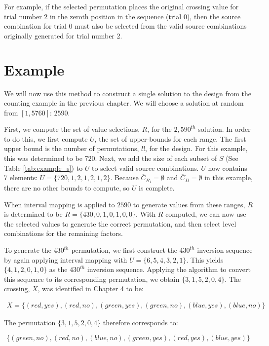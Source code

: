 For example, if the selected permutation places the original crossing value for trial number 2 in the zeroth position in the sequence (trial 0), then the source combination for trial 0 must also be selected from the valid source combinations originally generated for trial number 2.


\section{Example}

We will now use this method to construct a single solution to the design from the counting example in the previous chapter. We will choose a solution at random from $[1, 5760]$: $2590$.

First, we compute the set of value selections, $R$, for the $2,590^{th}$ solution. In order to do this, we first compute $U$, the set of upper-bounds for each range. The first upper bound is the number of permutations, $l!$, for the design. For this example, this was determined to be $720$. Next, we add the size of each subset of $S$ (See Table \ref{tab:example_s}) to $U$ to select valid source combinations. $U$ now contains 7 elements: $U = \{720, 1, 2, 1, 2, 1, 2\}$. Because $\overline{C}_{B_I} = \emptyset$ and $\overline{C}_D = \emptyset$ in this example, there are no other bounds to compute, so $U$ is complete.

When interval mapping is applied to $2590$ to generate values from these ranges, $R$ is determined to be $R = \{430, 0, 1, 0, 1, 0, 0\}$. With $R$ computed, we can now use the selected values to generate the correct permutation, and then select level combinations for the remaining factors.

To generate the $430^{th}$ permutation, we first construct the $430^{th}$ inversion sequence by again applying interval mapping with $U = \{6, 5, 4, 3, 2, 1\}$. This yields $\{4, 1, 2, 0, 1, 0\}$ as the $430^{th}$ inversion sequence. Applying the algorithm to convert this sequence to its corresponding permutation, we obtain $\{3, 1, 5, 2, 0, 4\}$. The crossing, $X$, was identified in Chapter 4 to be:

\begin{align*}
X = \{(red, yes), (red, no), (green, yes), (green, no), (blue, yes), (blue, no)\}
\end{align*}

The permutation $\{3, 1, 5, 2, 0, 4\}$ therefore corresponds to:

\[
    \{(green, no), (red, no), (blue, no), (green, yes), (red, yes), (blue, yes)\}
\]


